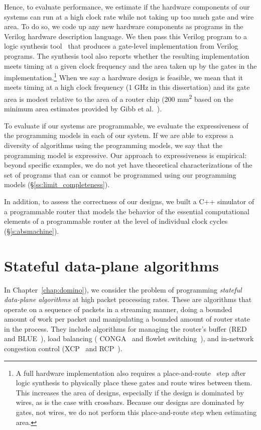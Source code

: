 Hence, to evaluate performance, we estimate if the hardware components of our
systems can run at a high clock rate while not taking up too much gate and wire
area. To do so, we code up any new hardware components as programs in the
Verilog hardware description language.  We then pass this Verilog program to a
logic synthesis tool~\cite{synopsys_dc, cadence_rc} that produces a gate-level
implementation from Verilog programs.  The synthesis tool also reports whether
the resulting implementation meets timing at a given clock frequency and the
area taken up by the gates in the implementation.\footnote{A full hardware
implementation also requires a place-and-route~\cite{par} step after logic
synthesis to physically place these gates and route wires between them. This
increases the area of designs, especially if the design is dominated by wires,
as is the case with crossbars. Because our designs are dominated by gates, not
wires, we do not perform this place-and-route step when estimating area.} When
we say a hardware design is feasible, we mean that it meets timing at a high
clock frequency (1 GHz in this dissertation) and its gate area is modest
relative to the area of a router chip (200 \si{\milli\meter\squared} based on
the minimum area estimates provided by Gibb et al.~\cite{gibb_parsing}). 

To evaluate if our systems are programmable, we evaluate the expressiveness of
the programming models in each of our system. If we are able to express a
diversity of algorithms using the programming models, we say that the
programming model is expressive. Our approach to expressiveness is empirical:
beyond specific examples, we do not yet have theoretical characterizations of
the set of programs that can or cannot be programmed using our programming
models (\S\ref{ss:limit_completeness}).

In addition, to assess the correctness of our designs, we built a C++ simulator
of a programmable router that models the behavior of the essential
computational elements of a programmable router at the level of individual
clock cycles (\S\ref{s:absmachine}).

\section{Stateful data-plane algorithms}
In Chapter~\ref{chap:domino}), we consider the problem of programming {\em
stateful data-plane algorithms} at high packet processing rates. These are
algorithms that operate on a sequence of packets in a streaming manner, doing
a bounded amount of work per packet and manipulating a bounded amount of router
state in the process.  They include algorithms for managing the router's buffer
(\eg RED~\cite{red} and BLUE~\cite{blue}), load balancing (\eg
CONGA~\cite{conga} and flowlet switching~\cite{flowlets}), and in-network
congestion control (\eg XCP~\cite{xcp} and RCP~\cite{rcp}).

